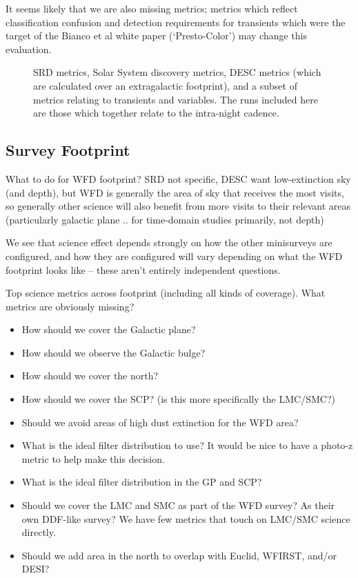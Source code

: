 It seems likely that we are also missing metrics; metrics which reflect classification confusion and detection requirements for transients which were the target of the Bianco et al white paper (`Presto-Color') may change this evaluation. 

\begin{figure}
\caption{SRD metrics, Solar System discovery metrics, DESC metrics (which are calculated over an extragalactic footprint), and a subset of metrics relating to transients and variables. The runs included here are those which together relate to the intra-night cadence.}
\label{fig:intranight}
\end{figure}


\subsection{Survey Footprint}\label{sec:bigfootprints}

What to do for WFD footprint? SRD not specific, DESC want low-extinction sky (and depth), but WFD is generally the area of sky that receives the most visits, so generally other science will also benefit from more visits to their relevant areas (particularly galactic plane .. for time-domain studies primarily, not depth)

We see that science effect depends strongly on how the other minisurveys are configured, and how they are configured will vary depending on what the WFD footprint looks like -- these aren't entirely independent questions. 

Top science metrics across footprint (including all kinds of coverage). 
What metrics are obviously missing?

\begin{itemize}
    \item{How should we cover the Galactic plane?}
    \item{How should we observe the Galactic bulge?}
    \item{How should we cover the north?}
    \item{How should we cover the SCP? (is this more specifically the LMC/SMC?)}
    \item{Should we avoid areas of high dust extinction for the WFD area?}
    \item{What is the ideal filter distribution to use? It would be nice to have a photo-z metric to help make this decision.}
    \item{What is the ideal filter distribution in the GP and SCP?}
    \item{Should we cover the LMC and SMC as part of the WFD survey? As their own DDF-like survey? We have few metrics that touch on LMC/SMC science directly.}
    \item{Should we add area in the north to overlap with Euclid, WFIRST, and/or DESI?}
\end{itemize}



